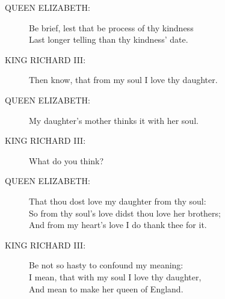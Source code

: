 \documentclass{article}
\begin{document}
\begin{description}
\item[QUEEN ELIZABETH:] 
\hspace{1pt}Be brief, lest that be process of thy kindness\\
\hspace{1pt}Last longer telling than thy kindness' date.\\
\end{description}
\begin{description}
\item[KING RICHARD III:] 
\hspace{1pt}Then know, that from my soul I love thy daughter.\\
\end{description}
\begin{description}
\item[QUEEN ELIZABETH:] 
\hspace{1pt}My daughter's mother thinks it with her soul.\\
\end{description}
\begin{description}
\item[KING RICHARD III:] 
\hspace{1pt}What do you think?\\
\end{description}
\begin{description}
\item[QUEEN ELIZABETH:] 
\hspace{1pt}That thou dost love my daughter from thy soul:\\
\hspace{1pt}So from thy soul's love didst thou love her brothers;\\
\hspace{1pt}And from my heart's love I do thank thee for it.\\
\end{description}
\begin{description}
\item[KING RICHARD III:] 
\hspace{1pt}Be not so hasty to confound my meaning:\\
\hspace{1pt}I mean, that with my soul I love thy daughter,\\
\hspace{1pt}And mean to make her queen of England.\\
\end{description}
\end{document}
